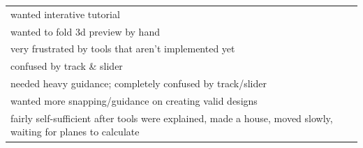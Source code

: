 \begin{longtable}[c]{@{}l@{}}
\begin{minipage}[t]{0.82\columnwidth}\raggedright\strut
wanted interative tutorial
\strut\end{minipage}\tabularnewline
\begin{minipage}[t]{0.82\columnwidth}\raggedright\strut
wanted to fold 3d preview by hand
\strut\end{minipage}\tabularnewline
\begin{minipage}[t]{0.82\columnwidth}\raggedright\strut
very frustrated by tools that aren't implemented yet
\strut\end{minipage}\tabularnewline
\begin{minipage}[t]{0.82\columnwidth}\raggedright\strut
confused by track \& slider
\strut\end{minipage}\tabularnewline
\begin{minipage}[t]{0.82\columnwidth}\raggedright\strut
needed heavy guidance; completely confused by track/slider
\strut\end{minipage}\tabularnewline
\begin{minipage}[t]{0.82\columnwidth}\raggedright\strut
wanted more snapping/guidance on creating valid designs
\strut\end{minipage}\tabularnewline
\begin{minipage}[t]{0.82\columnwidth}\raggedright\strut
fairly self-sufficient after tools were explained, made a house, moved
slowly, waiting for planes to calculate
\strut\end{minipage}\tabularnewline
\bottomrule
\end{longtable}
